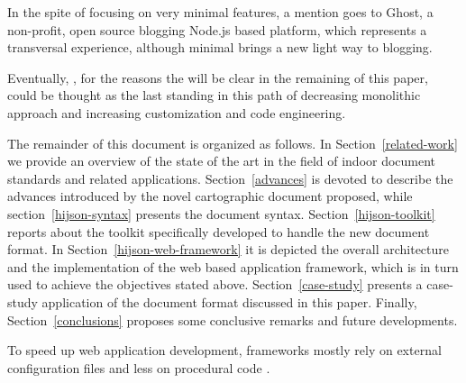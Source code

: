 In the spite of focusing on very minimal features, a mention goes to Ghost, a non-profit, open source blogging Node.js based platform, which represents a transversal experience, although minimal brings a new light way to blogging.

Eventually, , for the reasons the will be clear in the remaining of this paper, could be thought as the last standing in this path of decreasing monolithic approach and increasing customization and code engineering.

The remainder of this document is organized as follows. In
Section~\ref{related-work} we provide an overview of the state of the art in
the field of indoor document standards and related applications.
Section~\ref{advances} is devoted to describe the advances introduced by the
novel cartographic document proposed, while section~\ref{hijson-syntax}
presents the document syntax. Section~\ref{hijson-toolkit} reports about the
toolkit specifically developed to handle the new document format. In
Section~\ref{hijson-web-framework} it is depicted the overall architecture and
the implementation of the web based application framework, which is in turn
used to achieve the objectives stated above. Section~\ref{case-study} presents
a case-study application of the document format discussed in this paper.
Finally, Section~\ref{conclusions} proposes some conclusive remarks and future
developments.








To speed up web application development, frameworks mostly rely on external configuration files and less on procedural code \cite{6859693}.
